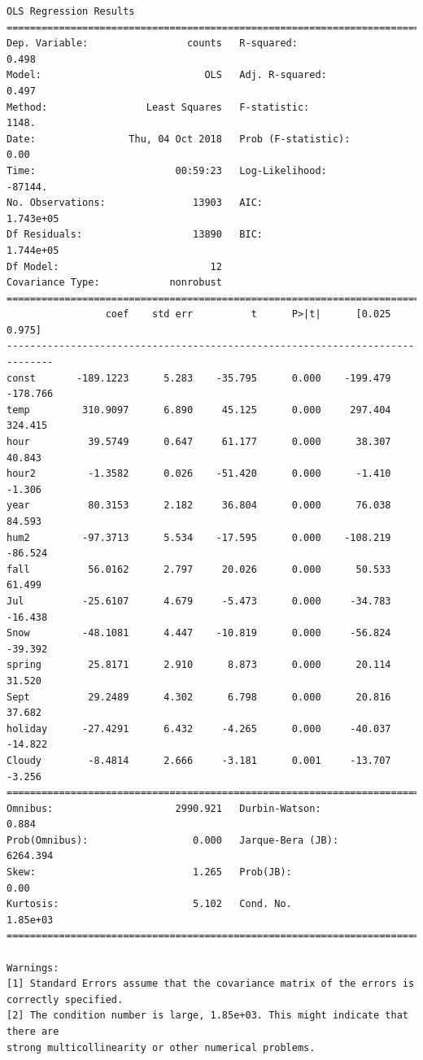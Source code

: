 \documentclass[11pt]{article}
\begin{document}
    \begin{Verbatim}[commandchars=\\\{\}]
                            OLS Regression Results                            
==============================================================================
Dep. Variable:                 counts   R-squared:                       0.498
Model:                            OLS   Adj. R-squared:                  0.497
Method:                 Least Squares   F-statistic:                     1148.
Date:                Thu, 04 Oct 2018   Prob (F-statistic):               0.00
Time:                        00:59:23   Log-Likelihood:                -87144.
No. Observations:               13903   AIC:                         1.743e+05
Df Residuals:                   13890   BIC:                         1.744e+05
Df Model:                          12                                         
Covariance Type:            nonrobust                                         
==============================================================================
                 coef    std err          t      P>|t|      [0.025      0.975]
------------------------------------------------------------------------------
const       -189.1223      5.283    -35.795      0.000    -199.479    -178.766
temp         310.9097      6.890     45.125      0.000     297.404     324.415
hour          39.5749      0.647     61.177      0.000      38.307      40.843
hour2         -1.3582      0.026    -51.420      0.000      -1.410      -1.306
year          80.3153      2.182     36.804      0.000      76.038      84.593
hum2         -97.3713      5.534    -17.595      0.000    -108.219     -86.524
fall          56.0162      2.797     20.026      0.000      50.533      61.499
Jul          -25.6107      4.679     -5.473      0.000     -34.783     -16.438
Snow         -48.1081      4.447    -10.819      0.000     -56.824     -39.392
spring        25.8171      2.910      8.873      0.000      20.114      31.520
Sept          29.2489      4.302      6.798      0.000      20.816      37.682
holiday      -27.4291      6.432     -4.265      0.000     -40.037     -14.822
Cloudy        -8.4814      2.666     -3.181      0.001     -13.707      -3.256
==============================================================================
Omnibus:                     2990.921   Durbin-Watson:                   0.884
Prob(Omnibus):                  0.000   Jarque-Bera (JB):             6264.394
Skew:                           1.265   Prob(JB):                         0.00
Kurtosis:                       5.102   Cond. No.                     1.85e+03
==============================================================================

Warnings:
[1] Standard Errors assume that the covariance matrix of the errors is correctly specified.
[2] The condition number is large, 1.85e+03. This might indicate that there are
strong multicollinearity or other numerical problems.

    \end{Verbatim}
\end{document}
